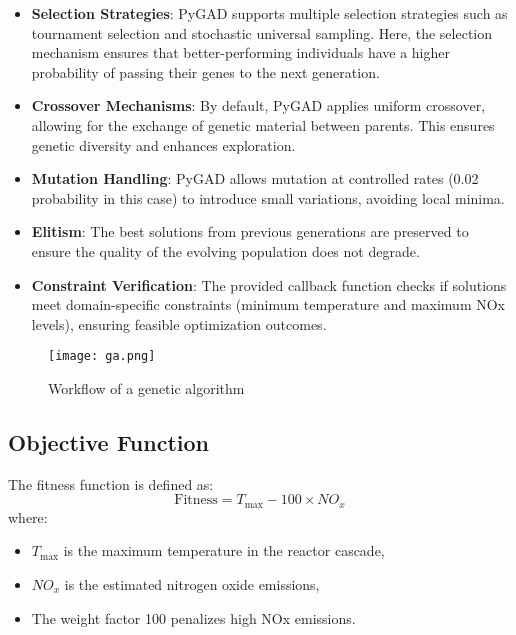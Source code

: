 \documentclass[12pt]{report}
\begin{document}
\begin{itemize}
    \item \textbf{Selection Strategies}: PyGAD supports multiple selection strategies such as tournament selection and stochastic universal sampling. Here, the selection mechanism ensures that better-performing individuals have a higher probability of passing their genes to the next generation.
    \item \textbf{Crossover Mechanisms}: By default, PyGAD applies uniform crossover, allowing for the exchange of genetic material between parents. This ensures genetic diversity and enhances exploration.
    \item \textbf{Mutation Handling}: PyGAD allows mutation at controlled rates (0.02 probability in this case) to introduce small variations, avoiding local minima.
    \item \textbf{Elitism}: The best solutions from previous generations are preserved to ensure the quality of the evolving population does not degrade.
    \item \textbf{Constraint Verification}: The provided callback function checks if solutions meet domain-specific constraints (minimum temperature and maximum NOx levels), ensuring feasible optimization outcomes.
\end{itemize}

\begin{figure}[H]
    \centering
    \texttt{[image: ga.png]}
    \caption{Workflow of a genetic algorithm \cite{gad2021}}
    
\end{figure}



\subsection{Objective Function}
The fitness function is defined as:
\begin{equation}
    \text{Fitness} = T_{\max} - 100 \times NO_x
\end{equation}
where:
\begin{itemize}
    \item $T_{\max}$ is the maximum temperature in the reactor cascade,
    \item $NO_x$ is the estimated nitrogen oxide emissions,
    \item The weight factor 100 penalizes high NOx emissions.
\end{itemize}
\end{document}
